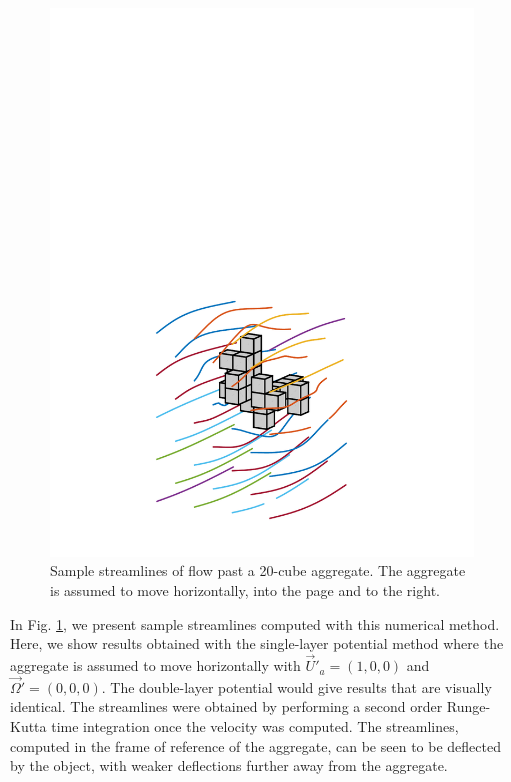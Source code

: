 \begin{figure}[ht]
	\begin{center}
	  \includegraphics[scale = 0.4]{./figures/fig_streamlines25_fig120.pdf}
	 \end{center}
	\caption{Sample streamlines of flow past a 20-cube aggregate. The aggregate is assumed to move horizontally, into the page and to the right.
	}
	\label{fig_stream}
	\end{figure}
	
	In Fig. \ref{fig_stream}, we present sample streamlines computed with this numerical method. Here, we show results obtained with the single-layer potential method where the aggregate is assumed to move horizontally with $\vec{U}'_a = (1,0,0)$ and $\vec{\Omega}' = (0,0,0)$. The double-layer potential would give results that are visually identical. The streamlines were obtained by performing a second order Runge-Kutta time integration once the velocity was computed.  The streamlines, computed in the frame of reference of the aggregate, can be seen to be deflected by the object, with weaker deflections further away from the aggregate.


